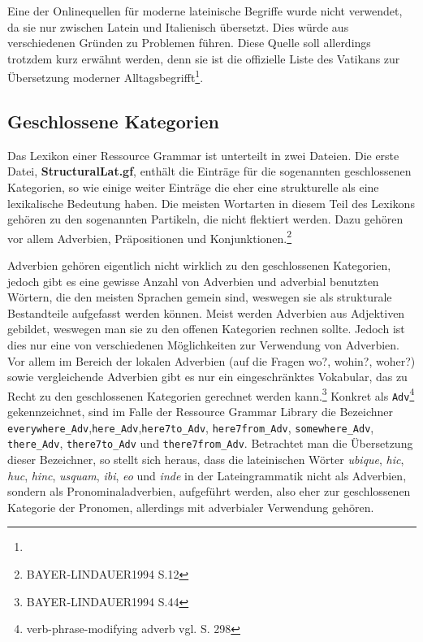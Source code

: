 \documentclass[12pt,abstract=on,titlepage,bibliography=totoc,ngerman,listof=totoc]{scrreprt}
\begin{document}
Eine der Onlinequellen für moderne lateinische Begriffe wurde nicht verwendet, da sie nur zwischen Latein und Italienisch übersetzt. Dies würde aus verschiedenen Gründen zu Problemen führen. Diese Quelle soll allerdings trotzdem kurz erwähnt werden, denn sie ist die offizielle Liste des Vatikans zur Übersetzung moderner Alltagsbegrifft\footnote{\vatlatinitas}.
\subsection{Geschlossene Kategorien}
\label{subsec:geschlossene}
Das Lexikon einer Ressource Grammar ist unterteilt in zwei Dateien. Die erste Datei, \textbf{StructuralLat.gf}, enthält die Einträge für die sogenannten geschlossenen Kategorien, so wie einige weiter Einträge die eher eine strukturelle als eine lexikalische Bedeutung haben. Die meisten Wortarten in diesem Teil des Lexikons gehören zu den sogenannten Partikeln, die nicht flektiert werden. Dazu gehören vor allem Adverbien, Präpositionen und Konjunktionen.\footnote{BAYER-LINDAUER1994 S.12} \par
Adverbien gehören eigentlich nicht wirklich zu den geschlossenen Kategorien, jedoch gibt es eine gewisse Anzahl von Adverbien und adverbial benutzten Wörtern, die den meisten Sprachen gemein sind, weswegen sie als strukturale Bestandteile aufgefasst werden können. Meist werden Adverbien aus Adjektiven gebildet, weswegen man sie zu den offenen Kategorien rechnen sollte. Jedoch ist dies nur eine von verschiedenen Möglichkeiten zur Verwendung von Adverbien. Vor allem im  Bereich der lokalen Adverbien (auf die Fragen wo?, wohin?, woher?) sowie vergleichende Adverbien gibt es nur ein eingeschränktes Vokabular, das zu Recht zu den geschlossenen Kategorien gerechnet werden kann.\footnote{BAYER-LINDAUER1994 S.44} 
Konkret als \texttt{Adv}\footnote{verb-phrase-modifying adverb vgl. \cite{RANTA2011} S. 298} gekennzeichnet, sind im Falle der Ressource Grammar Library die Bezeichner \texttt{everywhere\_Adv},\texttt{here\_Adv},\texttt{here7to\_Adv}, \texttt{here7from\_Adv}, \texttt{somewhere\_Adv}, \texttt{there\_Adv}, \texttt{there7to\_Adv} und \texttt{there7from\_Adv}. Betrachtet man die Übersetzung dieser Bezeichner, so stellt sich heraus, dass die lateinischen Wörter \textit{ubique}, \textit{hic}, \textit{huc}, \textit{hinc}, \textit{usquam}, \textit{ibi}, \textit{eo} und \textit{inde} in der Lateingrammatik nicht als Adverbien, sondern als Pronominaladverbien, aufgeführt werden, also eher zur geschlossenen Kategorie der Pronomen, allerdings mit adverbialer Verwendung gehören. \par
\end{document}
